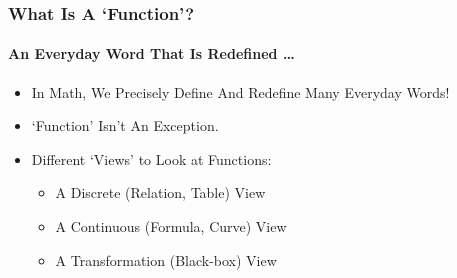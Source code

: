 \begin{frame}
\frametitle{What Is A `Function'?}
\framesubtitle{An Everyday Word That Is Redefined \dots}
\label{slide:function-versatile}
\begin{itemize}
\pause
\item In Math, We \alert{Precisely Define And Redefine} Many Everyday Words!
\pause
\item `Function' Isn't An Exception.
\pause
\item Different `Views' to Look at Functions:
\begin{itemize}
\pause
\item A Discrete (Relation, Table) View
\pause
\item A Continuous (Formula, Curve) View
\pause
\item A Transformation (Black-box) View
\end{itemize}
\end{itemize}
\end{frame}
